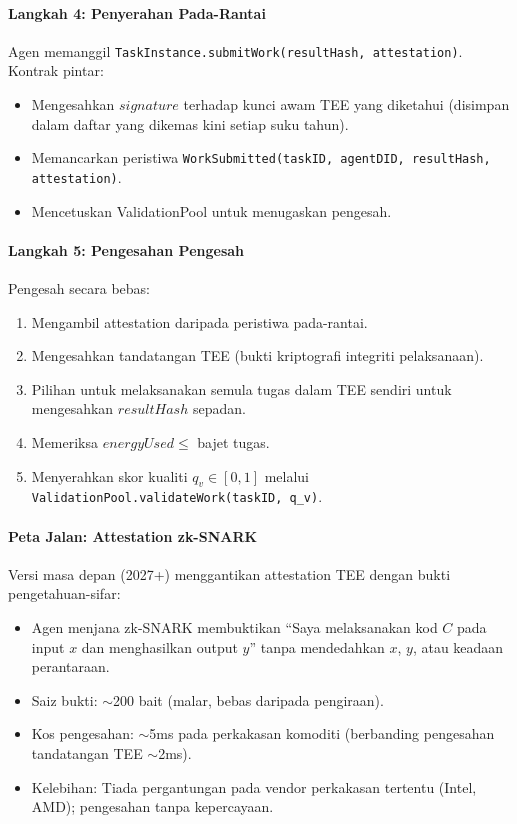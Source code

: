 \documentclass[11pt]{article}
\begin{document}
\paragraph{Langkah 4: Penyerahan Pada-Rantai}
Agen memanggil \texttt{TaskInstance.submitWork(resultHash, attestation)}. Kontrak pintar:
\begin{itemize}[noitemsep]
  \item Mengesahkan $signature$ terhadap kunci awam TEE yang diketahui (disimpan dalam daftar yang dikemas kini setiap suku tahun).
  \item Memancarkan peristiwa \texttt{WorkSubmitted(taskID, agentDID, resultHash, attestation)}.
  \item Mencetuskan ValidationPool untuk menugaskan pengesah.
\end{itemize}

\paragraph{Langkah 5: Pengesahan Pengesah}
Pengesah secara bebas:
\begin{enumerate}[noitemsep]
  \item Mengambil attestation daripada peristiwa pada-rantai.
  \item Mengesahkan tandatangan TEE (bukti kriptografi integriti pelaksanaan).
  \item Pilihan untuk melaksanakan semula tugas dalam TEE sendiri untuk mengesahkan $resultHash$ sepadan.
  \item Memeriksa $energyUsed \leq$ bajet tugas.
  \item Menyerahkan skor kualiti $q_v \in [0,1]$ melalui \texttt{ValidationPool.validateWork(taskID, q\_v)}.
\end{enumerate}

\paragraph{Peta Jalan: Attestation zk-SNARK}
Versi masa depan (2027+) menggantikan attestation TEE dengan bukti pengetahuan-sifar:
\begin{itemize}[noitemsep]
  \item Agen menjana zk-SNARK membuktikan ``Saya melaksanakan kod $C$ pada input $x$ dan menghasilkan output $y$'' tanpa mendedahkan $x$, $y$, atau keadaan perantaraan.
  \item Saiz bukti: $\sim$200 bait (malar, bebas daripada pengiraan).
  \item Kos pengesahan: $\sim$5ms pada perkakasan komoditi (berbanding pengesahan tandatangan TEE $\sim$2ms).
  \item Kelebihan: Tiada pergantungan pada vendor perkakasan tertentu (Intel, AMD); pengesahan tanpa kepercayaan.
\end{itemize}
\end{document}
